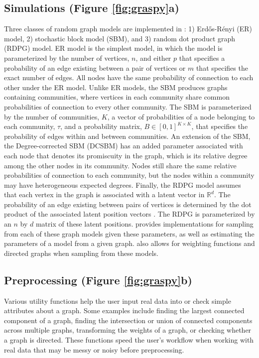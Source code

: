 \subsection{Simulations (Figure \ref{fig:graspy}a)} Three classes of random graph models are implemented in \graspy: 1) Erd\H os-R\'enyi (ER) model, 2) stochastic block model (SBM), and 3) random dot product graph (RDPG) model. ER model is the simplest model, in which the model is parameterized by the number of vertices, $n$, and either $p$ that specifies a probability of an edge existing between a pair of vertices or $m$ that specifies the exact number of edges. All nodes have the same probability of connection to each other under the ER model. Unlike ER models, the SBM produces graphs containing communities, where vertices in each community share common probabilities of connection to every other community. The SBM is parameterized by the number of communities, $K$, a vector of probabilities of a node belonging to each community, $\tau$, and a probability matrix, $B\in[0,1]^{K \times K}$, that specifies the probability of edges within and between communities. An extension of the SBM, the Degree-corrected SBM (DCSBM) has an added parameter associated with each node that denotes its promiscuity in the graph, which is its relative degree among the other nodes in its community. Nodes still share the same relative probabilities of connection to each community, but the nodes within a community may have heterogeneous expected degrees. Finally, the RDPG model assumes that each vertex in the graph is associated with a latent vector in $\mathbb{R}^d$. The probability of an edge existing between pairs of vertices is determined by the dot product of the associated latent position vectors \cite{young2007random}. The RDPG is parameterized by an $n$ by $d$ matrix of these latent positions. \graspy provides implementations for sampling from each of these graph models given these parameters, as well as estimating the parameters of a model from a given graph. \graspy also allows for weighting functions and directed graphs when sampling from these models.

\subsection{Preprocessing (Figure \ref{fig:graspy}b)}
Various utility functions help the user input real data into \graspy or check simple attributes about a graph. Some examples include finding the largest connected component of a graph, finding the intersection or union of connected components across multiple graphs, transforming the weights of a graph, or checking whether a graph is directed. These functions speed the user's workflow when working with real data that may be messy or noisy before preprocessing.

